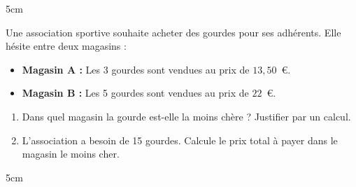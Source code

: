 \documentclass[a4paper]{book}
\begin{document}
{\begin{exercice}
        \begin{ZoneReponse}{5cm}
        \end{ZoneReponse}
    \end{exercice}


    \begin{exercice}
        Une association sportive souhaite acheter des gourdes pour ses adhérents. Elle hésite entre deux magasins :
        \begin{itemize}
            \item \textbf{Magasin A :} Les 3 gourdes sont vendues au prix de $13,50$~\euro.
            \item \textbf{Magasin B :} Les 5 gourdes sont vendues au prix de $22$~\euro.
        \end{itemize}
        \begin{enumerate}
            \item Dans quel magasin la gourde est-elle la moins chère ? Justifier par un calcul.
            \item L'association a besoin de 15 gourdes. Calcule le prix total à payer dans le magasin le moins cher.
        \end{enumerate}
    
        \begin{ZoneReponse}{5cm}
        \end{ZoneReponse}
    \end{exercice}

}  
\end{document}
